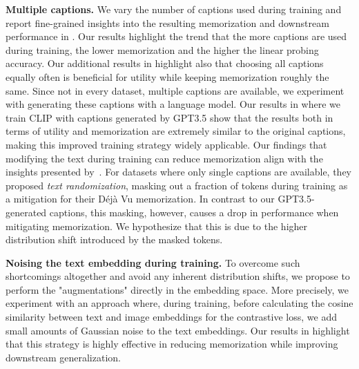 \textbf{Multiple captions.}
We vary the number of captions used during training and report fine-grained insights into the resulting memorization and downstream performance in . 
Our results highlight the trend that the more captions are used during training, the lower memorization and the higher the linear probing accuracy.
Our additional results in  highlight also that choosing all captions equally often is beneficial for utility while keeping memorization roughly the same.
Since not in every dataset, multiple captions are available, we experiment with generating these captions with a language model. Our results in  where we train CLIP with captions generated by GPT3.5 show that the results both in terms of utility and memorization are extremely similar to the original captions, making this improved training strategy widely applicable. 
Our findings that modifying the text during training can reduce memorization align with the insights presented by~\citet{jayaraman2024}.
For datasets where only single captions are available, they proposed \textit{text randomization}, \ie masking out a fraction of tokens during training as a mitigation for their Déjà Vu memorization.
In contrast to our GPT3.5-generated captions, this masking, however, causes a drop in performance when mitigating memorization. We hypothesize that this is due to the higher distribution shift introduced by the masked tokens. %

\textbf{Noising the text embedding during training.} 
To overcome such shortcomings altogether and avoid any inherent distribution shifts, we propose to perform the "augmentations" directly in the embedding space.
More precisely, we experiment with an approach where, during training, before calculating the cosine similarity between text and image embeddings for the contrastive loss, we add small amounts of Gaussian noise to the text embeddings.
Our results in   highlight that this strategy is highly effective in reducing memorization while improving downstream generalization. %

